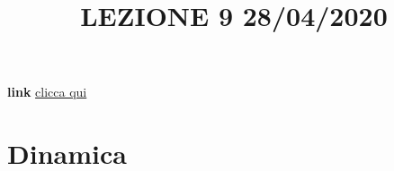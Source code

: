 \title{LEZIONE 9 28/04/2020}\newline
\textbf{link} \href{https://web.microsoftstream.com/video/673607e9-751d-488b-bb1d-79ee783a9b29}{clicca qui}
\section{Dinamica}